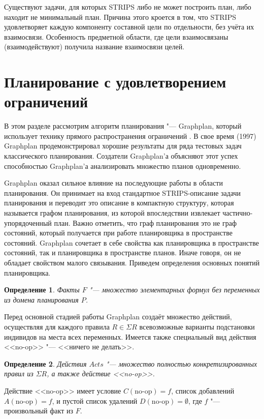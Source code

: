 \documentclass[b5paper,11pt]{book}
\newtheorem{Def}{Определение}
\begin{document}
	Существуют задачи, для которых STRIPS либо не может построить план, либо находит не минимальный план. Причина этого кроется в том, что STRIPS удовлетворяет каждую компоненту составной цели по отдельности, без учёта их взаимосвязи. Особенность предметной области, где цели взаимосвязаны (взаимодействуют) получила название взаимосвязи целей.
	
	\section{Планирование с удовлетворением ограничений}
	
	В этом разделе рассмотрим алгоритм планирования "--- Graphplan, который использует технику прямого распространения ограничений \cite{Blum1997}. В свое время (1997) Graphplan продемонстрировал хорошие результаты для ряда тестовых задач классического планирования. Создатели Graphplan'а объясняют этот успех способностью Graphplan'а анализировать множество планов одновременно. 
	
	Graphplan оказал сильное влияние на последующие работы в области планирования. Он принимает на вход стандартное STRIPS-описание задачи планирования и переводит это описание в компактную структуру, которая называется графом планирования, из которой впоследствии извлекает частично-упорядоченный план. Важно отметить, что граф планирования это не граф состояний, который получается при работе планировщика в пространстве состояний. Graphplan сочетает в себе свойства как планировщика в пространстве состояний, так и планировщика в пространстве планов. Иначе говоря, он не обладает свойством малого связывания. Приведем определения основных понятий планировщика.
	
	\begin{Def}
		Факты $F$ "--- множество элементарных формул без переменных из домена планирования $P$.
	\end{Def}
	
	Перед основной стадией работы Graphplan создаёт множество действий, осуществляя для каждого правила $R\in\Sigma R$ всевозможные варианты подстановки индивидов на места всех переменных. Имеется также специальный вид действия <<no-op>> "--- <<ничего не делать>>.
	
	\begin{Def}
		Действия $Acts$ "--- множество полностью конкретизированных правил из $\Sigma R$, а также действие <<no-op>>.
	\end{Def}

	Действие <<no-op>> имеет условие $C(\text{no-op})=f$, список добавлений $A(\text{no-op})=f$, и пустой список удалений $D(\text{no-op})=\emptyset$, где $f$ "--- произвольный факт из $F$.
\end{document}

